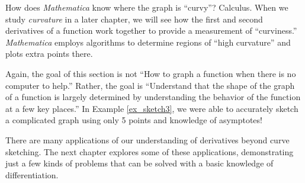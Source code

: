 How does \textit{Mathematica} know where the graph is ``curvy''? Calculus. When we study \textit{curvature} in a later chapter, we will see how the first and second derivatives of a function work together to provide a measurement of ``curviness.'' \textit{Mathematica} employs algorithms to determine regions of ``high curvature'' and plots extra points there.

Again, the goal of this section is not ``How to graph a function when there is no computer to help.'' Rather, the goal is ``Understand that the shape of the graph of a function is largely determined by understanding the behavior of the function at a few key places.'' In Example \ref{ex_sketch3}, we were able to accurately sketch a complicated graph using only 5 points and knowledge of asymptotes!

There are many applications of our understanding of derivatives beyond curve sketching. The next chapter explores some of these applications, demonstrating just a few kinds of problems that can be solved with a basic knowledge of differentiation. 

